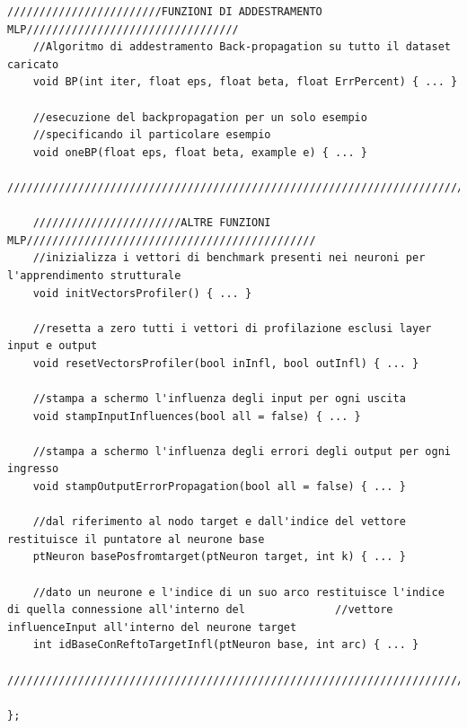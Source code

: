 \documentclass[10pt,a4paper]{article}
\begin{document}
\begin{lstlisting}[style=mycuda, caption=class MLP, captionpos=b]
	////////////////////////FUNZIONI DI ADDESTRAMENTO MLP/////////////////////////////////
	//Algoritmo di addestramento Back-propagation su tutto il dataset caricato
	void BP(int iter, float eps, float beta, float ErrPercent) { ... }
	
	//esecuzione del backpropagation per un solo esempio 
	//specificando il particolare esempio
	void oneBP(float eps, float beta, example e) { ... }
	//////////////////////////////////////////////////////////////////////////////////////
	
	///////////////////////ALTRE FUNZIONI MLP/////////////////////////////////////////////
	//inizializza i vettori di benchmark presenti nei neuroni per l'apprendimento strutturale
	void initVectorsProfiler() { ... }
	
	//resetta a zero tutti i vettori di profilazione esclusi layer input e output
	void resetVectorsProfiler(bool inInfl, bool outInfl) { ... }
	
	//stampa a schermo l'influenza degli input per ogni uscita
	void stampInputInfluences(bool all = false) { ... }
	
	//stampa a schermo l'influenza degli errori degli output per ogni ingresso
	void stampOutputErrorPropagation(bool all = false) { ... }
	
	//dal riferimento al nodo target e dall'indice del vettore restituisce il puntatore al neurone base
	ptNeuron basePosfromtarget(ptNeuron target, int k) { ... }
	
	//dato un neurone e l'indice di un suo arco restituisce l'indice di quella connessione all'interno del 				//vettore influenceInput all'interno del neurone target
	int idBaseConReftoTargetInfl(ptNeuron base, int arc) { ... }
	//////////////////////////////////////////////////////////////////////////////////////

};

\end{lstlisting}
\clearpage
\end{document}
